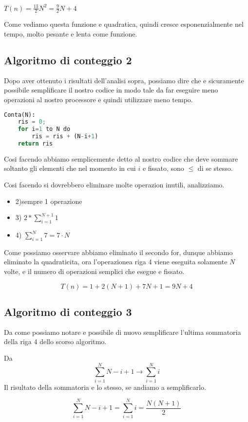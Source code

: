 $T(n) = \frac{13}{2}N^2 = \frac{9}{2}N + 4$

Come vediamo questa funzione e quadratica, quindi cresce esponenzialmente nel tempo, molto pesante e lenta come funzione.



\subsection{Algoritmo di conteggio 2}
Dopo aver ottenuto i risultati dell'analisi sopra, possiamo dire che e sicuramente possibile semplificare il nostro codice in modo tale da far eseguire meno operazioni al nostro processore e quindi utilizzare meno tempo.
\\

\begin{lstlisting}[language=Python]
Conta(N):
	ris = 0;
	for i=1 to N do
		ris = ris + (N-i+1)
	return ris
\end{lstlisting}

Cosi facendo abbiamo semplicemente detto al nostro codice che deve sommare soltanto gli elementi che nel momento in cui $i$ e fissato, sono $\le$ di se stesso.

Cosi facendo si dovrebbero eliminare molte operazion inutili, analizziamo.

\begin{itemize}
\item 2)sempre 1 operazione
\item 3) $2*\sum_{i=1}^{N+1} 1$
\item 4) $\sum_{i=1}^{N} 7 = 7\cdot N $
\end{itemize}

Come possiamo osservare abbiamo eliminato il secondo for, dunque abbiamo eliminato la quadraticita, ora l'operazionea riga 4 viene eseguita solamente $N$ volte, e il numero di operazioni semplici che esegue e fissato.

$$T(n) = 1 + 2(N+1) + 7N + 1 = 9N+4$$

\subsection{Algoritmo di conteggio 3}
Da come possiamo notare e possibile di nuovo semplificare l'ultima sommatoria della riga 4 dello scorso algoritmo.

Da $$\sum_{i=1}^{N} N-i+1 \rightarrow \sum_{i=1}^{N} i$$
Il risultato della sommatoria e lo stesso, se andiamo a semplificarlo.

$$\sum_{i=1}^{N} N-i+1 = \sum_{i=1}^{N}i = \frac{N(N+1)}{2}$$

